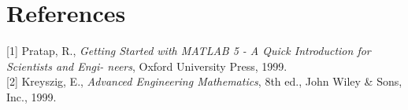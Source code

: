 \documentclass[paper=a4, fontsize=11pt]{scrartcl} %
\numberwithin{equation}{section} %
\numberwithin{figure}{section} %
\numberwithin{table}{section} %
\begin{document}
\newpage
\section*{\textbf{References}}
[1] Pratap, R., \textit{Getting Started with MATLAB 5 - A Quick Introduction for Scientists and Engi-
neers}, Oxford University Press, 1999.\\

[2] Kreyszig, E., \textit{Advanced Engineering Mathematics}, 8th ed., John Wiley \& Sons, Inc., 1999.
\end{document}
